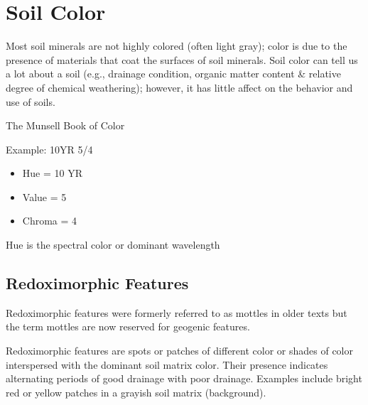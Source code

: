 \documentclass[a5paper]{book}
\begin{document}
\section{Soil Color}
    
Most soil minerals are not highly colored (often light gray); color is due to the presence of materials that coat the surfaces of soil minerals. Soil color can tell us a lot about a soil (e.g., drainage condition, organic matter content \& relative degree of chemical weathering); however, it has little affect on the behavior and use of soils.
    
The Munsell Book of Color
    
Example: 10YR 5/4
    
\begin{itemize}
    \item Hue = 10 YR
    \item Value = 5
    \item Chroma = 4
\end{itemize}
    
Hue is the spectral color or dominant wavelength
    
\subsection{Redoximorphic Features}
    
Redoximorphic features were formerly referred to as mottles in older texts but the term mottles are now reserved for geogenic features.
    
Redoximorphic features are spots or patches of different color or shades of color interspersed with the dominant soil matrix color. Their presence indicates alternating periods of good drainage with poor drainage. Examples include bright red or yellow patches in a grayish soil matrix (background).
\end{document}
